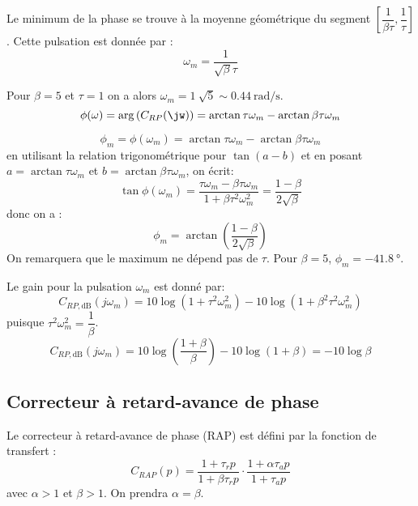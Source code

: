 \begin{center}
    
\end{center}

Le minimum de la phase se trouve à la moyenne géométrique du segment 
$\left[\dfrac{1}{\beta\tau},\dfrac{1}{\tau}\right]$. Cette pulsation 
est donnée par :
\[
    \omega_m=\dfrac{1}{\sqrt{\beta}\tau}
\]

Pour $\beta=5$ et $\tau=1$ on a alors $\omega_m=\SI{1}{\sqrt{5}}\sim\SI{0.44}{\radian\per\second}$.
\[
    \phi(\omega)=\arg{(C_{RP}(\jw))}=\arctan{\tau\omega_m}-\arctan{\beta\tau\omega_m}
\]

\[
    \phi_m=\phi(\omega_m)=\arctan{\tau\omega_m}-\arctan{\beta\tau\omega_m}
\]
en utilisant la relation trigonométrique pour $\tan{(a-b)}$ et en posant $a=\arctan{\tau\omega_m}$ 
et $b=\arctan{\beta\tau\omega_m}$, on écrit:
\[
    \tan{\phi(\omega_m)}=\dfrac{\tau\omega_m-\beta\tau\omega_m}{1+\beta\tau^2\omega_m^2}
                        =\dfrac{1-\beta}{2\sqrt{\beta}}
\]
donc on a :
\[
    \phi_m=\arctan{\left(\dfrac{1-\beta}{2\sqrt{\beta}}\right)}
\]
On remarquera que le maximum ne dépend pas de $\tau$.
Pour $\beta=5$, $\phi_m=\SI{-41.8}{\degree}$.

Le gain pour la pulsation $\omega_m$ est donné par:
\[
    C_{RP,\si{\dB}}(j\omega_m)=10\log{(1+\tau^2\omega_m^2)}-
                               10\log{(1+\beta^2\tau^2\omega_m^2)}
\]
puisque $\tau^2\omega_m^2=\dfrac{1}{\beta}$.
\[
    C_{RP,\si{\dB}}(j\omega_m)=10\log{\left(\dfrac{1+\beta}{\beta}\right)}-10\log{\left(1+\beta\right)}=-10\log{\beta}
\]

\subsection{Correcteur à retard-avance de phase}
Le correcteur à retard-avance de phase (RAP) est défini par la fonction de transfert :
\[
    C_{RAP}(p)=\dfrac{1+\tau_r p}{1+\beta\tau_r p}\cdot\dfrac{1+\alpha\tau_a p}{1+\tau_a p}
\]
avec $\alpha>1$ et $\beta>1$. On prendra $\alpha=\beta$.

